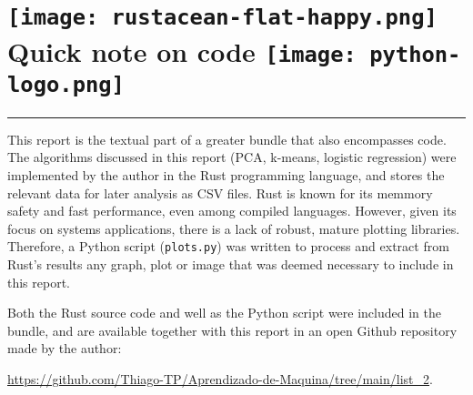     \section*{
    \texttt{[image: rustacean-flat-happy.png]}
    \hfill
    Quick note on code
    \hfill
    \texttt{[image: python-logo.png]}
}
\vspace{-.25cm}
\noindent\rule{\textwidth}{.5pt}

This report is the textual part of a greater bundle that also encompasses code.
The algorithms discussed in this report (PCA, k-means, logistic regression)
were implemented by the author in the Rust programming language, 
and stores the relevant data for later analysis as CSV files. 
%
Rust is known for its memmory safety and fast performance, even among compiled languages.
However, given its focus on systems applications, there is a lack of robust, mature plotting libraries.
%
Therefore, a Python script (\texttt{plots.py}) was written to process and extract from Rust's results 
any graph, plot or image that was deemed necessary to include in this report.

Both the Rust source code and well as the Python script were included in the bundle, 
and are available together with this report in an open Github repository made by the author:

\noindent\centering\url{https://github.com/Thiago-TP/Aprendizado-de-Maquina/tree/main/list_2}.